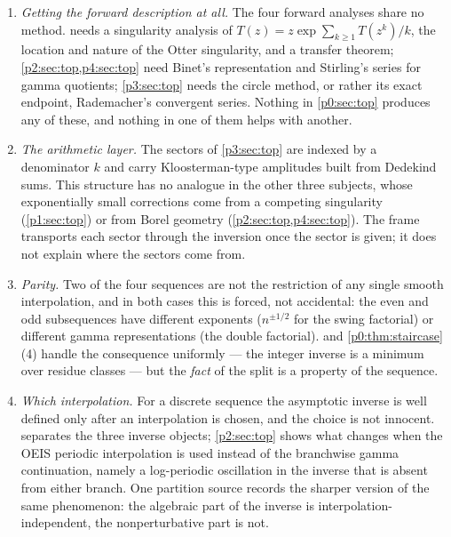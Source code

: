 \documentclass[11pt,a4paper,oneside]{book}
\theoremstyle{plain}
\theoremstyle{definition}
\theoremstyle{remark}
\begin{document}
\begin{enumerate}[label=(\alph*),leftmargin=*]
\item \emph{Getting the forward description at all.}  The four forward
      analyses share no method.   needs a singularity
      analysis of $T(z)=z\exp\sum_{k\ge1}T(z^k)/k$, the location and nature of
      the Otter singularity, and a transfer theorem;
      \cref{p2:sec:top,p4:sec:top} need Binet's representation and Stirling's
      series for gamma quotients; \cref{p3:sec:top} needs the circle method,
      or rather its exact endpoint, Rademacher's convergent series.  Nothing
      in \cref{p0:sec:top} produces any of these, and nothing in one of them
      helps with another.
\item \emph{The arithmetic layer.}  The sectors of \cref{p3:sec:top} are
      indexed by a denominator $k$ and carry Kloosterman-type amplitudes built
      from Dedekind sums.  This structure has no analogue in the other three
      subjects, whose exponentially small corrections come from a competing
      singularity (\cref{p1:sec:top}) or from Borel geometry
      (\cref{p2:sec:top,p4:sec:top}).  The frame transports each sector
      through the inversion once the sector is given; it does not explain
      where the sectors come from.
\item \emph{Parity.}  Two of the four sequences are not the restriction of any
      single smooth interpolation, and in both cases this is forced, not
      accidental: the even and odd subsequences have different exponents
      ($n^{\pm1/2}$ for the swing factorial) or different gamma
      representations (the double factorial).  
      and \cref{p0:thm:staircase}(4) handle the consequence uniformly --- the
      integer inverse is a minimum over residue classes --- but the
      \emph{fact} of the split is a property of the sequence.
\item \emph{Which interpolation.}  For a discrete sequence the asymptotic
      inverse is well defined only after an interpolation is chosen, and the
      choice is not innocent.   separates the three
      inverse objects; \cref{p2:sec:top} shows what changes when the OEIS
      periodic interpolation is used instead of the branchwise gamma
      continuation, namely a log-periodic oscillation in the inverse that is
      absent from either branch.  One partition source records the sharper
      version of the same phenomenon: the algebraic part of the inverse is
      interpolation-independent, the nonperturbative part is not.
\end{enumerate}
\end{document}
